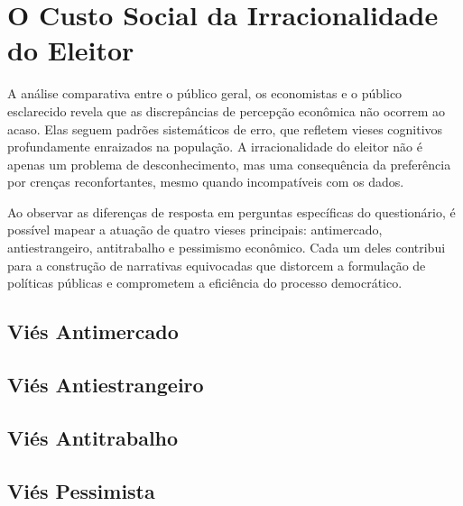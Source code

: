 \section{O Custo Social da Irracionalidade do Eleitor} 

A análise comparativa entre o público geral, os economistas e o público esclarecido revela que as discrepâncias de percepção econômica não ocorrem ao acaso. Elas seguem padrões sistemáticos de erro, que refletem vieses cognitivos profundamente enraizados na população. A irracionalidade do eleitor não é apenas um problema de desconhecimento, mas uma consequência da preferência por crenças reconfortantes, mesmo quando incompatíveis com os dados.

Ao observar as diferenças de resposta em perguntas específicas do questionário, é possível mapear a atuação de quatro vieses principais: antimercado, antiestrangeiro, antitrabalho e pessimismo econômico. Cada um deles contribui para a construção de narrativas equivocadas que distorcem a formulação de políticas públicas e comprometem a eficiência do processo democrático.

\subsection{Viés Antimercado}

\subsection{Viés Antiestrangeiro}

\subsection{Viés Antitrabalho}

\subsection{Viés Pessimista}